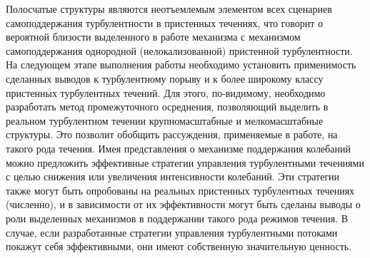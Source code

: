 Полосчатые структуры являются неотъемлемым элементом всех сценариев самоподдержания турбулентности в пристенных течениях, что говорит о вероятной близости выделенного в работе механизма с механизмом самоподдержания однородной (нелокализованной) пристенной турбулентности. На следующем этапе выполнения работы необходимо установить применимость сделанных выводов к турбулентному порыву и к более широкому классу пристенных турбулентных течений. Для этого, по-видимому, необходимо разработать метод промежуточного осреднения, позволяющий выделить в реальном турбулентном течении крупномасштабные и мелкомасштабные структуры. Это позволит обобщить рассуждения, применяемые в работе, на такого рода течения. Имея представления о механизме поддержания колебаний можно предложить эффективные стратегии управления турбулентными течениями с целью снижения или увеличения интенсивности колебаний. Эти стратегии также могут быть опробованы на реальных пристенных турбулентных течениях (численно), и в зависимости от их эффективности могут быть сделаны выводы о роли выделенных механизмов в поддержании такого рода режимов течения. В случае, если разработанные стратегии управления турбулентными потоками покажут себя эффективными, они имеют собственную значительную ценность. 







